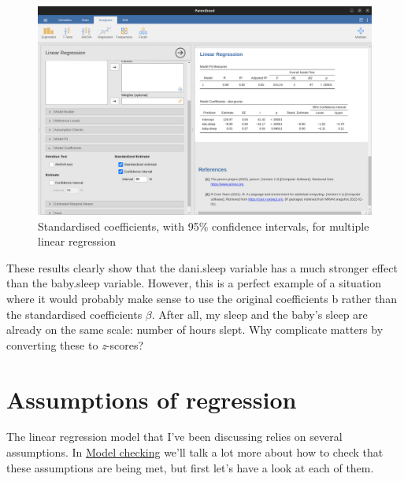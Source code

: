 \documentclass[
  a4paper,
]{book}
\begin{document}
\begin{figure}

\includegraphics[width=1\textwidth,height=\textheight]{images/fig12-16.png} \hfill{}

\caption{\label{fig-fig12-16}Standardised coefficients, with 95\%
confidence intervals, for multiple linear regression}

\end{figure}

These results clearly show that the dani.sleep variable has a much
stronger effect than the baby.sleep variable. However, this is a perfect
example of a situation where it would probably make sense to use the
original coefficients b rather than the standardised coefficients
\(\beta\). After all, my sleep and the baby's sleep are already on the
same scale: number of hours slept. Why complicate matters by converting
these to \emph{z}-scores?

\hypertarget{assumptions-of-regression}{%
\section{Assumptions of regression}\label{assumptions-of-regression}}

The linear regression model that I've been discussing relies on several
assumptions. In \protect\hyperlink{sec-Model-checking}{Model checking}
we'll talk a lot more about how to check that these assumptions are
being met, but first let's have a look at each of them.
\end{document}

